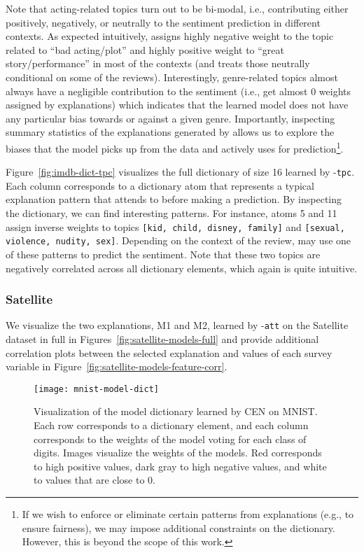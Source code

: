 \documentclass[twoside,11pt]{article}
\begin{document}
Note that acting-related topics turn out to be bi-modal, i.e., contributing either positively, negatively, or neutrally to the sentiment prediction in different contexts.
As expected intuitively, {\CEN} assigns highly negative weight to the topic related to ``bad acting/plot'' and highly positive weight to ``great story/performance'' in most of the contexts (and treats those neutrally conditional on some of the reviews).
Interestingly, genre-related topics almost always have a negligible contribution to the sentiment (i.e., get almost 0 weights assigned by explanations) which indicates that the learned model does not have any particular bias towards or against a given genre.
Importantly, inspecting summary statistics of the explanations generated by {\CEN} allows us to explore the biases that the model picks up from the data and actively uses for prediction\footnote{If we wish to enforce or eliminate certain patterns from explanations (e.g., to ensure fairness), we may impose additional constraints on the dictionary.
However, this is beyond the scope of this work.
}.

Figure~\ref{fig:imdb-dict-tpc} visualizes the full dictionary of size 16 learned by {\CEN}-\texttt{tpc}.
Each column corresponds to a dictionary atom that represents a typical explanation pattern that {\CEN} attends to before making a prediction.
By inspecting the dictionary, we can find interesting patterns.
For instance, atoms 5 and 11 assign inverse weights to topics \texttt{[kid, child, disney, family]} and \texttt{[sexual, violence, nudity, sex]}.
Depending on the context of the review, {\CEN} may use one of these patterns to predict the sentiment.
Note that these two topics are negatively correlated across all dictionary elements, which again is quite intuitive.

\subsubsection{Satellite}

We visualize the two explanations, M1 and M2, learned by {\CEN}-\texttt{att} on the Satellite dataset in full in
Figures~\ref{fig:satellite-models-full} and provide additional correlation plots between the selected explanation and values of each survey variable in Figure~\ref{fig:satellite-models-feature-corr}.



\begin{figure}[t!]
    \centering
    \texttt{[image: mnist-model-dict]}
    \caption{Visualization of the model dictionary learned by CEN on MNIST.
    Each row corresponds to a dictionary element, and each column corresponds to the weights of the model voting for each class of digits.
    Images visualize the weights of the models.
    Red corresponds to high positive values, dark gray to high negative values, and white to values that are close to 0.}
    \label{fig:mnist-dict}
\end{figure}
 
\end{document}
